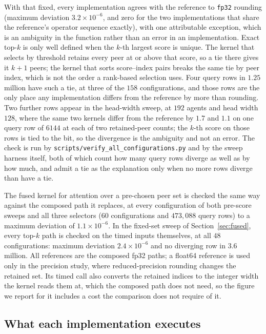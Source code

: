 With that fixed, every implementation agrees with the reference to
\texttt{fp32} rounding (maximum deviation $3.2\times10^{-6}$, and zero for
the two implementations that share the reference's operator sequence exactly),
with one attributable exception, which is an ambiguity in the function rather
than an error in an implementation. Exact top-$k$ is only well defined when the
$k$-th largest score is unique. The kernel that selects by threshold retains
every peer at or above that score, so a tie there gives it $k{+}1$ peers; the
kernel that sorts score--index pairs breaks the same tie by peer index, which is
not the order a rank-based selection uses. Four query rows in $1.25$ million
have such a tie, at three of the $158$ configurations, and those rows are the
only place any implementation differs from the reference by more than rounding.
Two further rows appear in the head-width sweep, at $192$ agents and head width
$128$, where the same two kernels differ from the reference by $1.7$ and $1.1$
on one query row of $6144$ at each of two retained-peer counts; the $k$-th score
on those rows is tied to the bit, so the divergence is the ambiguity and not an
error. The check is run by
\texttt{scripts/verify\_all\_configurations.py} and by the sweep harness
itself, both of which count how many query rows diverge as well as by how much,
and admit a tie as the explanation only when no more rows diverge than have a
tie.

The fused kernel for attention over a pre-chosen peer set is checked the same
way against the composed path it replaces, at every configuration of both pre-score sweeps and all three selectors ($60$ configurations and $473{,}088$ query rows) to a maximum deviation of $1.1\times10^{-6}$. In the fixed-set sweep of Section~\ref{sec:fused}, every top-$k$ path is checked on the timed inputs themselves, at all $48$ configurations: maximum deviation $2.4\times10^{-6}$ and no diverging row in $3.6$ million. All references are the composed fp32 paths; a float64 reference is used only in the precision study, where reduced-precision rounding changes the retained set. Its timed call also converts the
retained indices to the integer width the kernel reads them at, which the
composed path does not need, so the figure we report for it includes a cost the
comparison does not require of it.

\subsection{What each implementation executes}


